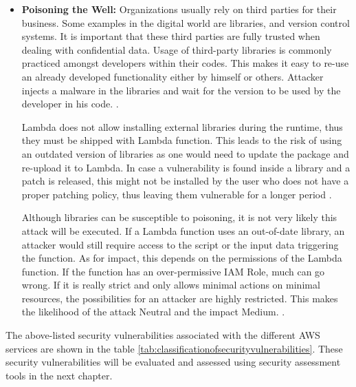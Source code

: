 \begin{itemize}
    \item \textbf{Poisoning the Well:} Organizations usually rely on third parties for their business.
    Some examples
    in the
    digital world are libraries, and version control systems.
    It is important that
    these third parties are fully trusted when dealing with confidential data.
    Usage of third-party libraries is
    commonly practiced amongst developers within their codes.
    This makes it easy to re-use an already developed
    functionality either by himself or others.
    Attacker injects a malware in the libraries and wait for the version to be used by the developer in his code.
    \cite{71}.

    Lambda does not allow installing external libraries
    during the runtime, thus they must be shipped with Lambda function.
    This leads to the risk of using an outdated version of libraries as one would need to update the package and re-upload it to Lambda.
    In case a vulnerability is found inside a library and a patch is released, this might not be installed by the
    user who does not have a proper patching policy, thus
    leaving them vulnerable for a longer period \cite{72}.

    Although libraries can be susceptible to poisoning, it is not very likely this attack will be executed.
    If a Lambda function uses an out-of-date library, an attacker would still require access to the script or the input data triggering the function.
    As for impact, this depends on the permissions of the Lambda function.
    If the function has an over-permissive IAM Role, much can go wrong.
    If it is really strict and only allows minimal actions on minimal resources, the possibilities for an attacker are highly restricted.
    This makes the likelihood of the attack Neutral and the impact Medium. \cite{64}.
\end{itemize}

\par The above-listed security vulnerabilities associated
with the different AWS services are shown in the table
\ref{tab:classificationofsecurityvulnerabilities}.
These
security vulnerabilities will be evaluated and assessed
using security
assessment tools in the next chapter.

